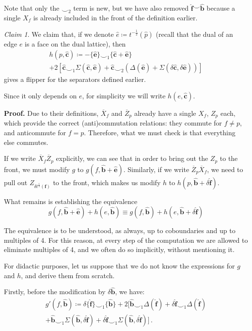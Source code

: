\documentclass[aps,twocolumn,prx,floatfix,preprintnumbers, nofootinbib,10pt]{revtex4-2}
\numberwithin{equation}{section}
\theoremstyle{definition}
\theoremstyle{remark}
\theoremstyle{claim}
\newtheorem{claim}[theorem]{Claim}
\newcommand{\be}{\begin{equation}}
\newcommand{\ee}{\end{equation}}
\newcommand{\paren}[1]{\left( #1 \right)}
\newcommand{\sqpar}[1]{\left[ #1 \right]}
\begin{document}
Note that only the $\smile_2$ term is new, but we have also removed $\bm{\hat{f}} \smile \bm{\hat{b}}$ because a single $X_f$ is already included in the front of the definition earlier.

\begin{claim}
 We claim that, if we denote $\hat{e} \coloneqq t^{-\frac{1}{2}}(\hat{p})$ (recall that the dual of an edge $e$ is a face on the dual lattice), then
 \begin{multline}
  h(p, \bm{\hat{c}}) \coloneqq - \{ \bm{\hat{e}} \} \smile_1 \{ \bm{\hat{c}} + \bm{\hat{e}} \} \\
  + 2 \sqpar{\bm{\hat{c}} \smile_1 \Sigma(\bm{\hat{c}}, \bm{\hat{e}}) + \bm{\hat{c}} \smile_2 \paren{\Delta(\bm{\hat{e}}) + \Sigma(\delta \bm{\hat{c}}, \delta \bm{\hat{e}})}}
 \end{multline}
 gives a flipper for the separators defined earlier.

 Since it only depends on $e$, for simplicity we will write $h(e, \bm{\hat{c}})$.
\end{claim}

\noindent
{\bf Proof.} Due to their definitions, $\overline{X}_f$ and $\overline{Z}_p$ already have a single $X_f$, $Z_p$ each, which provide the correct (anti)commutation relations: they commute for $f \neq p$, and anticommute for $f = p$. Therefore, what we must check is that everything else commutes.

If we write $\overline{X}_f \overline{Z}_p$ explicitly, we can see that in order to bring out the $Z_p$ to the front, we must modify $g$ to $g(f, \bm{\hat{b}} + \bm{\hat{e}})$. Similarly, if we write $\overline{Z}_p \overline{X}_f$, we need to pull out $Z_{\delta t^\frac{1}{2} (\bm{f})}$ to the front, which makes us modify $h$ to $h(p, \bm{\hat{b}} + \delta \bm{\hat{f}})$.

What remains is establishing the equivalence
\be
g(f, \bm{\hat{b}} + \bm{\hat{e}}) + h(e, \bm{\hat{b}}) \equiv g(f, \bm{\hat{b}}) + h(e, \bm{\hat{b}} + \delta \bm{\hat{f}})
\ee

The equivalence is to be understood, as always, up to coboundaries and up to multiples of 4. For this reason, at every step of the computation we are allowed to eliminate multiples of 4, and we often do so implicitly, without mentioning it.

For didactic purposes, let us suppose that we do not know the expressions for $g$ and $h$, and derive them from scratch.

Firstly, before the modification by $\delta \bm{\hat{b}}$, we have:
\begin{multline}
g'(f, \bm{\hat{b}}) \coloneqq \delta \{\bm{\hat{f}}\} \smile_1 \{ \bm{\hat{b}} \} + 2 \Big[ \bm{\hat{b}} \smile_1 \Delta(\bm{\hat{f}}) + \delta \bm{\hat{f}} \smile_1 \Delta(\bm{\hat{f}}) \\
+ \bm{\hat{b}} \smile_1 \Sigma(\bm{\hat{b}}, \delta \bm{\hat{f}}) + \delta \bm{\hat{f}} \smile_1 \Sigma(\bm{\hat{b}}, \delta \bm{\hat{f}}) \Big] \,.
\end{multline}
\end{document}
